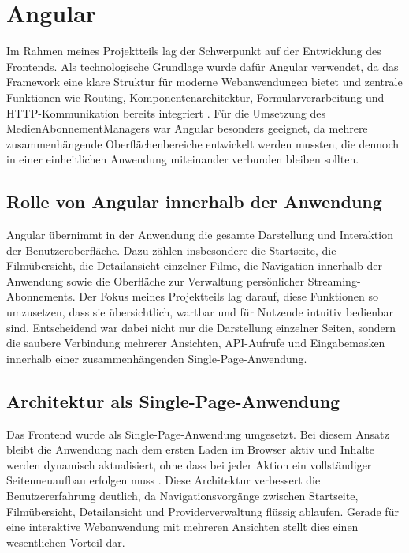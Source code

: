 \section{Angular}
Im Rahmen meines Projektteils lag der Schwerpunkt auf der Entwicklung des Frontends. Als technologische Grundlage wurde daf\"ur Angular verwendet, da das Framework eine klare Struktur f\"ur moderne Webanwendungen bietet und zentrale Funktionen wie Routing, Komponentenarchitektur, Formularverarbeitung und HTTP-Kommunikation bereits integriert \cite{angular_overview,angular_routing,angular_http,angular_components,angular_forms}. F\"ur die Umsetzung des MedienAbonnementManagers war Angular besonders geeignet, da mehrere zusammenh\"angende Oberfl\"achenbereiche entwickelt werden mussten, die dennoch in einer einheitlichen Anwendung miteinander verbunden bleiben sollten.

\subsection{Rolle von Angular innerhalb der Anwendung}
Angular \"ubernimmt in der Anwendung die gesamte Darstellung und Interaktion der Benutzeroberfl\"ache. Dazu z\"ahlen insbesondere die Startseite, die Film\"ubersicht, die Detailansicht einzelner Filme, die Navigation innerhalb der Anwendung sowie die Oberfl\"ache zur Verwaltung pers\"onlicher Streaming-Abonnements. Der Fokus meines Projektteils lag darauf, diese Funktionen so umzusetzen, dass sie \"ubersichtlich, wartbar und f\"ur Nutzende intuitiv bedienbar sind. Entscheidend war dabei nicht nur die Darstellung einzelner Seiten, sondern die saubere Verbindung mehrerer Ansichten, API-Aufrufe und Eingabemasken innerhalb einer zusammenh\"angenden Single-Page-Anwendung.

\subsection{Architektur als Single-Page-Anwendung}
Das Frontend wurde als Single-Page-Anwendung umgesetzt. Bei diesem Ansatz bleibt die Anwendung nach dem ersten Laden im Browser aktiv und Inhalte werden dynamisch aktualisiert, ohne dass bei jeder Aktion ein vollst\"andiger Seitenneuaufbau erfolgen muss \cite{mdn_spa}. Diese Architektur verbessert die Benutzererfahrung deutlich, da Navigationsvorg\"ange zwischen Startseite, Film\"ubersicht, Detailansicht und Providerverwaltung fl\"ussig ablaufen. Gerade f\"ur eine interaktive Webanwendung mit mehreren Ansichten stellt dies einen wesentlichen Vorteil dar.

